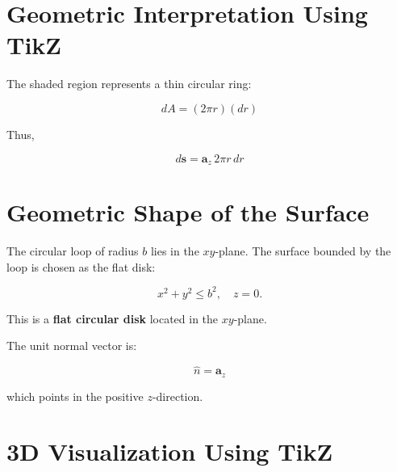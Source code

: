 \documentclass[12pt, a4paper]{article}
\begin{document}
\section{Geometric Interpretation Using TikZ}

\begin{center}
\end{center}

The shaded region represents a thin circular ring:

\[
dA = (2\pi r)(dr)
\]

Thus,

\[
d\mathbf{s} = \mathbf{a}_z\, 2\pi r\, dr
\]

\section{Geometric Shape of the Surface}

The circular loop of radius $b$ lies in the $xy$-plane.  
The surface bounded by the loop is chosen as the flat disk:

\[
x^2 + y^2 \le b^2, \quad z = 0.
\]

This is a \textbf{flat circular disk} located in the $xy$-plane.

The unit normal vector is:

\[
\hat{n} = \mathbf{a}_z
\]

which points in the positive $z$-direction.

\section{3D Visualization Using TikZ}
\end{document}
